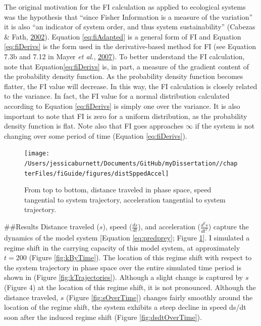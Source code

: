 \documentclass[12pt,twoside,openany]{reedthesis}
\begin{document}
The original motivation for the FI calculation as applied to ecological systems was the hypothesis that ``since Fisher Information is a measure of the variation'' it is also ``an indicator of system order, and thus system sustainability'' (Cabezas \& Fath, \protect\hyperlink{ref-cabezas_towards_2002}{2002}). Equation \eqref{eq:fiAdapted} is a general form of FI and Equation \eqref{eq:fiDerivs} is the form used in the derivative-based method for FI (see Equation 7.3b and 7.12 in Mayer \emph{et al.}, \protect\hyperlink{ref-mayer_applications_2007}{2007}). To better understand the FI calculation, note that Equation\eqref{eq:fiDerivs} is, in part, a measure of the gradient content of the probability density function. As the probability density function becomes flatter, the FI value will decrease. In this way, the FI calculation is closely related to the variance. In fact, the FI value for a normal distribution calculated according to Equation \eqref{eq:fiDerivs} is simply one over the variance. It is also important to note that FI is zero for a uniform distribution, as the probability density function is flat. Note also that FI goes approaches \(\infty\) if the system is not changing over some period of time (Equation \eqref{eq:fiDerivs}).
\begin{figure}
\texttt{[image: /Users/jessicaburnett/Documents/GitHub/myDissertation//chapterFiles/fiGuide/figures/distSppedAccel]} \caption{From top to bottom, distance traveled in phase space, speed tangential to system trajectory, acceleration tangential to system trajectory.}\label{fig:distSpeedAccel}
\end{figure}
\#\#Results
Distance traveled (\(s\)), speed (\(\frac{ds}{dt}\)), and acceleration (\(\frac{d^2 s}{dt^2}\)) capture the dynamics of the model system {[}Equation \eqref{eq:predprey}; Figure \ref{fig:distSpeedAccel}{]}. I simulated a regime shift in the carrying capacity of this model system, at approximately \(t=200\) (Figure \ref{fig:kByTime}). The location of this regime shift with respect to the system trajectory in phase space over the entire simulated time period is shown in (Figure \ref{fig:kTrajectories}). Although a slight change is captured by \(s\) (Figure 4) at the location of this regime shift, it is not pronounced. Although the distance traveled, \(s\) (Figure \ref{fig:sOverTime}) changes fairly smoothly around the location of the regime shift, the system exhibits a steep decline in speed ds/dt soon after the induced regime shift (Figure \ref{fig:dsdtOverTime}).
\end{document}
